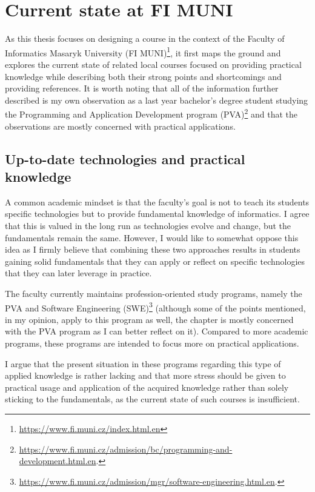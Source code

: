 \documentclass[
  digital,
  color,
  oneside,
  nosansbold,
  nocolorbold,
  lof,
  nolot,
]{fithesis4}
\begin{document}
\chapter{Current state at FI MUNI}\label{chapter-state}

As this thesis focuses on designing a course in the context of the Faculty of Informatics Masaryk University (FI MUNI)\footnote{\url{https://www.fi.muni.cz/index.html.en}}, it first maps the ground and explores the current state of related local courses focused on providing practical knowledge while describing both their strong points and shortcomings and providing references. It is worth noting that all of the information further described is my own observation as a last year bachelor's degree student studying the Programming and Application Development program (PVA)\footnote{\url{https://www.fi.muni.cz/admission/bc/programming-and-development.html.en}.} and that the observations are mostly concerned with practical applications.

\section{Up-to-date technologies and practical knowledge}

A common academic mindset is that the faculty's goal is not to teach its students specific technologies but to provide fundamental knowledge of informatics. I agree that this is valued in the long run as technologies evolve and change, but the fundamentals remain the same. However, I would like to somewhat oppose this idea as I firmly believe that combining these two approaches results in students gaining solid fundamentals that they can apply or reflect on specific technologies that they can later leverage in practice.

The faculty currently maintains profession-oriented study programs, namely the PVA and Software Engineering (SWE)\footnote{\url{https://www.fi.muni.cz/admission/mgr/software-engineering.html.en}.} (although some of the points mentioned, in my opinion, apply to this program as well, the chapter is mostly concerned with the PVA program as I can better reflect on it). Compared to more academic programs, these programs are intended to focus more on practical applications.

I argue that the present situation in these programs regarding this type of applied knowledge is rather lacking and that more stress should be given to practical usage and application of the acquired knowledge rather than solely sticking to the fundamentals, as the current state of such courses is insufficient.
\end{document}
